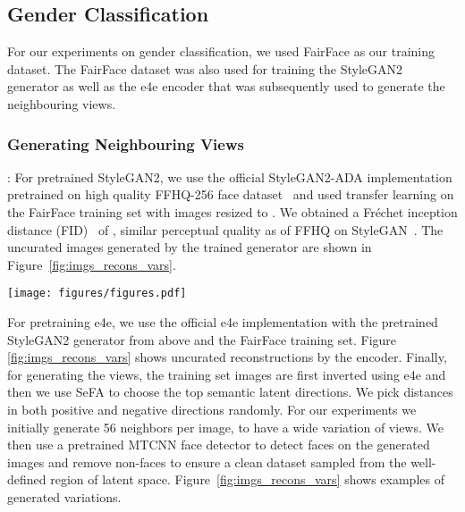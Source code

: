 \documentclass[runningheads]{llncs}
\begin{document}
\subsection{Gender Classification}
For our experiments on gender classification, we used FairFace as our training dataset. The FairFace dataset was also used for training the StyleGAN2 generator as well as the e4e encoder that was subsequently used to generate the neighbouring views. 




\subsubsection{\textbf{Generating Neighbouring Views}}: For pretrained StyleGAN2, we use the official StyleGAN2-ADA implementation pretrained on high quality FFHQ-256 face dataset~\cite{stylegan} and used transfer learning on the FairFace training set with images resized to . We obtained a Fréchet inception distance (FID)~\cite{fid} of , similar perceptual quality as of FFHQ on StyleGAN~\cite{stylegan}. The uncurated images generated by the trained generator are shown in Figure~\ref{fig:imgs_recons_vars}.

\begin{figure*}
    \centering
    \texttt{[image: figures/figures.pdf]}
    \caption{(a) Uncurated images generated by StyleGAN2 trained on FairFace. (b) Images reconstructed using the trained e4e encoder and pretrained StyleGAN2 generator. (c) Generative views created by selecting top semantic latent directions with SeFA and randomly sampling along those directions.}
    \label{fig:imgs_recons_vars}
    \vspace{-0.2em}
\end{figure*}


For pretraining e4e, we use the official e4e implementation with the pretrained StyleGAN2 generator from above and the FairFace training set. Figure \ref{fig:imgs_recons_vars} shows uncurated reconstructions by the encoder. Finally, for generating the views, the training set images are first inverted using e4e and then we use SeFA to choose the top  semantic latent directions. We pick distances in both positive and negative directions randomly. For our experiments we initially generate 56 neighbors per image, to have a wide variation of views. We then use a pretrained MTCNN face detector to detect faces on the generated images and remove non-faces to ensure a clean dataset sampled from the well-defined region of latent space. Figure~\ref{fig:imgs_recons_vars} shows examples of generated variations. 
\end{document}
